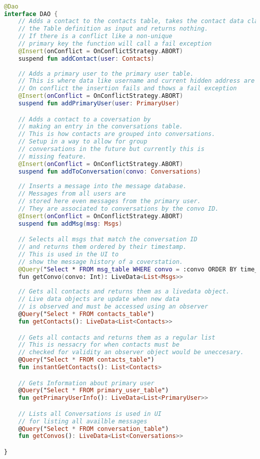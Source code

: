 \documentclass[../main/main.tex]{subfiles}
\begin{document}
\begin{lstlisting}[caption={Example of DAO definition.}, label={lst:example2}, language=Kotlin]

@Dao
interface DAO {
    // Adds a contact to the contacts table, takes the contact data class from
    // the Table definition as input and returns nothing.
    // If there is a conflict like a non-unique 
    // primary key the function will call a fail exception
    @Insert(onConflict = OnConflictStrategy.ABORT)
    suspend fun addContact(user: Contacts)
    
    // Adds a primary user to the primary user table.
    // This is where data like username and current hidden address are stored.
    // On conflict the insertion fails and thows a fail exception
    @Insert(onConflict = OnConflictStrategy.ABORT)
    suspend fun addPrimaryUser(user: PrimaryUser)

    // Adds a contact to a coversation by 
    // making an entry in the conversations table.
    // This is how contacts are grouped into conversations.
    // Setup in a way to allow for group 
    // conversations in the future but currently this is 
    // missing feature.
    @Insert(onConflict = OnConflictStrategy.ABORT)
    suspend fun addToConversation(convo: Conversations)
    
    // Inserts a message into the message database.
    // Messages from all users are 
    // stored here even messages from the primary user.
    // They are associated to conversations by the convo ID.
    @Insert(onConflict = OnConflictStrategy.ABORT)
    suspend fun addMsg(msg: Msgs)

    // Selects all msgs that match the conversation ID
    // and returns them ordered by their timestamp.
    // This is used in the UI to 
    // show the message history of a coverstation.
    @Query("Select * FROM msg_table WHERE convo = :convo ORDER BY time_stamp ASC")
    fun getConvo(convo: Int): LiveData<List<Msgs>>
    
    // Gets all contacts and returns them as a livedata object.
    // Live data objects are update when new data 
    // is observed and must be accessed using an observer
    @Query("Select * FROM contacts_table")
    fun getContacts(): LiveData<List<Contacts>>

    // Gets all contacts and returns them as a regular list
    // This is nessacry for when contacts must be 
    // checked for validity an observer object would be uneccesary.
    @Query("Select * FROM contacts_table")
    fun instantGetContacts(): List<Contacts>

    // Gets Information about primary user
    @Query("Select * FROM primary_user_table")
    fun getPrimaryUserInfo(): LiveData<List<PrimaryUser>>

    // Lists all Conversations is used in UI 
    // for listing all availble messages
    @Query("Select * FROM conversation_table")
    fun getConvos(): LiveData<List<Conversations>>

}
\end{lstlisting}
\end{document}
